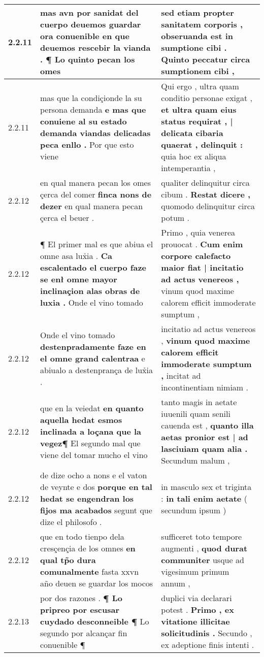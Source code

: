 \begin{tabular}{|p{1cm}|p{6.5cm}|p{6.5cm}|}
2.2.11 & mas avn \textbf{ por sanidat del cuerpo deuemos guardar ora conuenible en que deuemos rescebir la vianda . } ¶ Lo quinto pecan los omes & sed etiam propter sanitatem corporis , \textbf{ obseruanda est in sumptione cibi . } Quinto peccatur circa sumptionem cibi , \\\hline
2.2.11 & mas que la condiçionde la su persona demanda \textbf{ e mas que conuiene al su estado demanda viandas delicadas peca enllo . } Por que esto viene & Qui ergo , ultra quam conditio personae exigat , \textbf{ et ultra quam eius status requirat , | delicata cibaria quaerat , delinquit : } quia hoc ex aliqua intemperantia , \\\hline
2.2.12 & en qual manera pecan los omes çerca del comer \textbf{ finca nons de dezer } en qual manera pecan çerca el beuer . & qualiter delinquitur circa cibum . \textbf{ Restat dicere , } quomodo delinquitur circa potum . \\\hline
2.2.12 & ¶ El primer mal es que abiua el omne asa lux̉ia . \textbf{ Ca escalentado el cuerpo faze se enł omne mayor inclinaçion alas obras de luxia . } Onde el vino tomado & Primo , quia venerea prouocat . \textbf{ Cum enim corpore calefacto maior fiat | incitatio ad actus venereos , } vinum quod maxime calorem efficit immoderate sumptum , \\\hline
2.2.12 & Onde el vino tomado \textbf{ destenpradamente faze en el omne grand calentraa } e abiualo a destenprança de lux̉ia . & incitatio ad actus venereos , \textbf{ vinum quod maxime calorem efficit immoderate sumptum , } incitat ad incontinentiam nimiam . \\\hline
2.2.12 & que en la veiedat \textbf{ en quanto aquella hedat esmos inclinada a loçana que la vegez¶ } El segundo mal que viene del tomar mucho el vino & tanto magis in aetate iuuenili quam senili cauenda est , \textbf{ quanto illa aetas pronior est | ad lasciuiam quam alia . } Secundum malum , \\\hline
2.2.12 & de dize ocho a nons e el vaton de veynte e dos \textbf{ porque en tal hedat se engendran los fijos ma acabados } segunt que dize el philosofo . & in masculo sex et triginta : \textbf{ in tali enim aetate } ( secundum ipsum ) \\\hline
2.2.12 & que en todo tienpo dela cresçençia de los omnes \textbf{ en qual tp̃o dura comunalmente } fasta xxvn año deuen se guardar los mocos & sufficeret toto tempore augmenti , \textbf{ quod durat communiter } usque ad vigesimum primum annum , \\\hline
2.2.13 & por dos razones . \textbf{ ¶ Lo pripreo por escusar cuydado desconneible ¶ } Lo segundo por alcançar fin conuenible ¶ & duplici via declarari potest . \textbf{ Primo , ex vitatione illicitae solicitudinis . } Secundo , ex adeptione finis intenti . \\\hline

\end{tabular}
